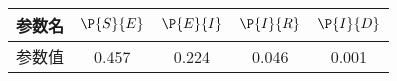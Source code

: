 \begin{tabular}{ccccc}
\hline
参数名&$\P{S}{E}$&$\P{E}{I}$&$\P{I}{R}$&$\P{I}{D}$\\
\hline
参数值&0.457&0.224&0.046&0.001\\
\hline
\end{tabular}